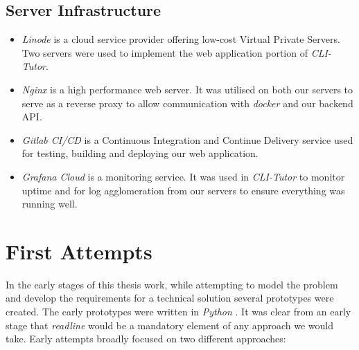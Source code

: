 \subsection{Server Infrastructure}
\begin{itemize}
    \item \textit{Linode} is a cloud service provider offering low-cost Virtual Private Servers. Two servers were used to implement the web application portion of \textit{CLI-Tutor}.
    \item \textit{Nginx} is a high performance web server. It was utilised on
        both our servers to serve as a reverse proxy to allow communication
        with \textit{docker} and our backend API.
    \item \textit{Gitlab CI/CD} is a Continuous Integration and Continue Delivery service used for testing, building and deploying our web application.
    \item \textit{Grafana Cloud} is a monitoring service. It was used in
        \textit{CLI-Tutor} to monitor uptime and for log agglomeration from our
        servers to ensure everything was running well.
\end{itemize}

\section{First Attempts} In the early stages of this thesis work, while
attempting to model the problem and develop the requirements for a technical
solution several prototypes were created. The early prototypes were written
in \textit{Python} \cite{python}. It was clear from an early stage that
\textit{readline} would be a mandatory element of any approach we would take. Early
attempts broadly focused on two different approaches:

